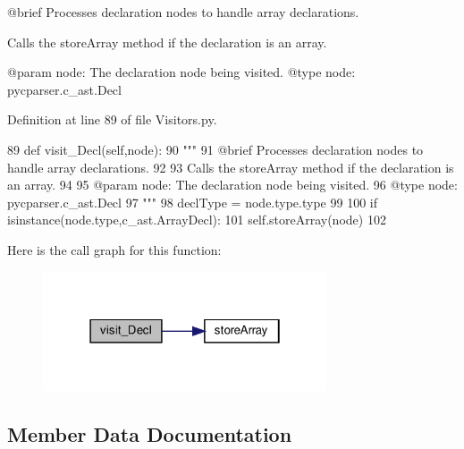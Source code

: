 \begin{DoxyVerb}@brief Processes declaration nodes to handle array declarations.

Calls the storeArray method if the declaration is an array.

@param node: The declaration node being visited.
@type node: pycparser.c_ast.Decl
\end{DoxyVerb}
 

Definition at line 89 of file Visitors.\+py.


\begin{DoxyCode}
89     \textcolor{keyword}{def }visit\_Decl(self,node):
90         \textcolor{stringliteral}{"""
}
91 \textcolor{stringliteral}{        @brief Processes declaration nodes to handle array declarations.
}
92 \textcolor{stringliteral}{
}
93 \textcolor{stringliteral}{        Calls the storeArray method if the declaration is an array.
}
94 \textcolor{stringliteral}{
}
95 \textcolor{stringliteral}{        @param node: The declaration node being visited.
}
96 \textcolor{stringliteral}{        @type node: pycparser.c\_ast.Decl
}
97 \textcolor{stringliteral}{        """}
98         declType = node.type.type
99 
100         \textcolor{keywordflow}{if} isinstance(node.type,c\_ast.ArrayDecl):
101             self.storeArray(node)
102 
\end{DoxyCode}
Here is the call graph for this function\+:\nopagebreak
\begin{figure}[H]
\begin{center}
\leavevmode
\includegraphics[width=238pt]{classVisitors_1_1DeclVisitor_a6568bead87923bbcaa593e5f226920f0_cgraph}
\end{center}
\end{figure}


\subsection{Member Data Documentation}
\mbox{\label{classVisitors_1_1DeclVisitor_a3c14dac355802b0266a75f0ee417c14b}} 
